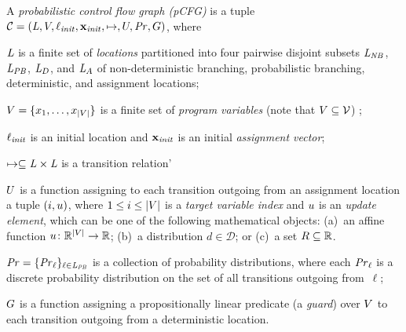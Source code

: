 \smallskip
\begin{definition}
\label{def:stochgame}
A \emph{probabilistic control flow graph (pCFG)} is a tuple
$\mathcal{C}=(\mathit{L},V,\ell_{\mathit{init}},\mathbf{x}_{\mathit{init}},\mapsto,U,\mathit{Pr},G)$,
where
\begin{compactitem}
\item $\mathit{L}$ is a finite set of \emph{locations} partitioned into four 
pairwise
disjoint subsets  $\mathit{L}_{\mathit{NB}}$, $\mathit{L}_{\mathit{PB}}$, $\mathit{L}_D$, and $\mathit{L}_A$ of 
non-deterministic branching, 
probabilistic branching, deterministic, and assignment locations;
\item $V=\{x_1,\dots,x_{|V|}\}$ is a finite set of \emph{program 
variables} (note that $V \subseteq \mathcal{V}$) ;
\item $\ell_{\mathit{init}}$ is an initial location and $\mathbf{x}_{\mathit{init}}$ is an initial 
\emph{assignment vector};
\item $\mapsto\subseteq\mathit{L}\times\mathit{L}$ is a transition relation'
\item $U$ is a function assigning to each transition outgoing from an 
assignment location a tuple $(i,u)$, where $1\leq i \leq |V|$ is a 
\emph{target 
	variable index} and $u$ 
is an 
\emph{update element}, which can 
be one of the following mathematical objects: %
(a)~an affine function $u\colon \mathbb{R}^{|V|}\rightarrow \mathbb{R}$;
(b)~a distribution $d\in \mathcal{D}$; or
(c)~a set $R\subseteq \mathbb{R}$.
\item $\mathit{Pr}=\{\mathit{Pr}_{\ell}\}_{\ell \in \mathit{L}_{\mathit{PB}}}$ is a collection of
probability distributions, where each $\mathit{Pr}_{\ell}$ is a discrete probability
distribution on the set of all transitions outgoing from~$\ell$;
\item $G$ is a function assigning a propositionally linear predicate
(a \emph{guard}) over $V$ to each transition outgoing from a deterministic 
location.
\end{compactitem}


\end{definition}
